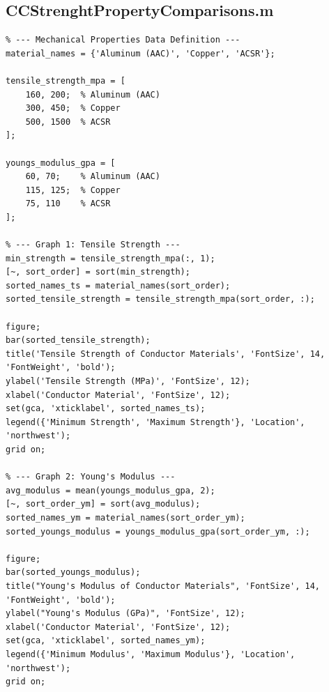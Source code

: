 \documentclass[12pt, a4paper]{article}
\begin{document}
\subsection{CCStrenghtPropertyComparisons.m}
\begin{lstlisting}
% --- Mechanical Properties Data Definition ---
material_names = {'Aluminum (AAC)', 'Copper', 'ACSR'};

tensile_strength_mpa = [
    160, 200;  % Aluminum (AAC)
    300, 450;  % Copper
    500, 1500  % ACSR
];

youngs_modulus_gpa = [
    60, 70;    % Aluminum (AAC)
    115, 125;  % Copper
    75, 110    % ACSR
];

% --- Graph 1: Tensile Strength ---
min_strength = tensile_strength_mpa(:, 1);
[~, sort_order] = sort(min_strength);
sorted_names_ts = material_names(sort_order);
sorted_tensile_strength = tensile_strength_mpa(sort_order, :);

figure;
bar(sorted_tensile_strength);
title('Tensile Strength of Conductor Materials', 'FontSize', 14, 'FontWeight', 'bold');
ylabel('Tensile Strength (MPa)', 'FontSize', 12);
xlabel('Conductor Material', 'FontSize', 12);
set(gca, 'xticklabel', sorted_names_ts);
legend({'Minimum Strength', 'Maximum Strength'}, 'Location', 'northwest');
grid on;

% --- Graph 2: Young's Modulus ---
avg_modulus = mean(youngs_modulus_gpa, 2);
[~, sort_order_ym] = sort(avg_modulus);
sorted_names_ym = material_names(sort_order_ym);
sorted_youngs_modulus = youngs_modulus_gpa(sort_order_ym, :);

figure;
bar(sorted_youngs_modulus);
title("Young's Modulus of Conductor Materials", 'FontSize', 14, 'FontWeight', 'bold');
ylabel("Young's Modulus (GPa)", 'FontSize', 12);
xlabel('Conductor Material', 'FontSize', 12);
set(gca, 'xticklabel', sorted_names_ym);
legend({'Minimum Modulus', 'Maximum Modulus'}, 'Location', 'northwest');
grid on;
\end{lstlisting}
\end{document}
